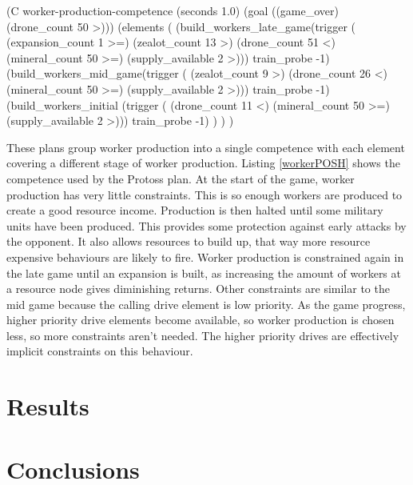 \documentclass[11pt,openright,a4paper]{report}
\begin{document}
\begin{Code}[frame=single,language=Lisp,tabsize=4,breaklines,breakatwhitespace,caption={A competence to control the production of worker units at different stages of the game.},label=workerPOSH]
(C worker-production-competence (seconds 1.0) (goal ((game_over) (drone_count 50 >)))
	(elements
		(
			(build_workers_late_game(trigger (
										(expansion_count 1 >=)
                                        (zealot_count 13 >)
										(drone_count 51 <)
										(mineral_count 50 >=)
										(supply_available 2 >)))
				train_probe -1)
			(build_workers_mid_game(trigger (
										(zealot_count 9 >)
										(drone_count 26 <)
										(mineral_count 50 >=)
										(supply_available 2 >)))
				train_probe -1)
			(build_workers_initial (trigger (
										(drone_count 11 <)
										(mineral_count 50 >=)
										(supply_available 2 >)))
				train_probe -1)
		)
	)
)
\end{Code}

These plans group worker production into a single competence with each element covering a different stage of worker production. Listing \ref{workerPOSH} shows the competence used by the Protoss plan. At the start of the game, worker production has very little constraints. This is so enough workers are produced to create a good resource income. Production is then halted until some military units have been produced. This provides some protection against early attacks by the opponent. It also allows resources to build up, that way more resource expensive behaviours are likely to fire. Worker production is constrained again in the late game until an expansion is built, as increasing the amount of workers at a resource node gives diminishing returns. Other constraints are similar to the mid game because the calling drive element is low priority. As the game progress, higher priority drive elements become available, so worker production is chosen less, so more constraints aren't needed. The higher priority drives are effectively implicit constraints on this behaviour.



\chapter{Results}




\chapter{Conclusions}
%
\end{document}
